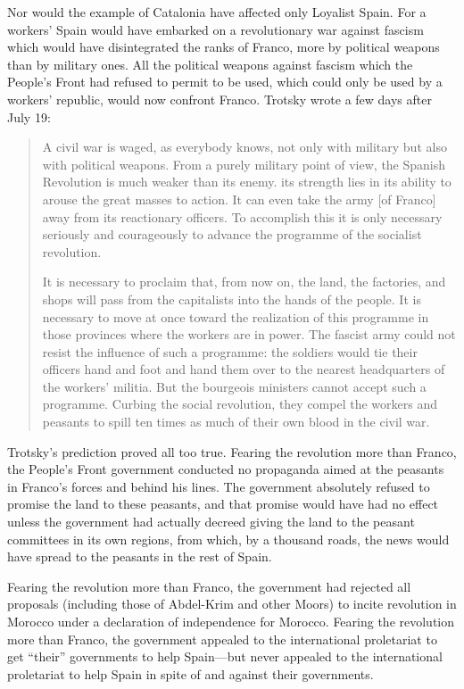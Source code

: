 Nor would the example of Catalonia have affected only Loyalist Spain. For a workers’ Spain would have embarked on a revolutionary war against fascism which would have disintegrated the ranks of Franco, more by political weapons than by military ones. All the political weapons against fascism which the People’s Front had refused to permit to be used, which could only be used by a workers’ republic, would now confront Franco. Trotsky wrote a few days after July 19:

\begin{quotation}
  A civil war is waged, as everybody knows, not only with military but also with political weapons. From a purely military point of view, the Spanish Revolution is much weaker than its enemy. its strength lies in its ability to arouse the great masses to action. It can even take the army [of Franco] away from its reactionary officers. To accomplish this it is only necessary seriously and courageously to advance the programme of the socialist revolution.

  It is necessary to proclaim that, from now on, the land, the factories, and shops will pass from the capitalists into the hands of the people. It is necessary to move at once toward the realization of this programme in those provinces where the workers are in power. The fascist army could not resist the influence of such a programme: the soldiers would tie their officers hand and foot and hand them over to the nearest headquarters of the workers’ militia. But the bourgeois ministers cannot accept such a programme. Curbing the social revolution, they compel the workers and peasants to spill ten times as much of their own blood in the civil war.
\end{quotation}

Trotsky’s prediction proved all too true. Fearing the revolution more than Franco, the People’s Front government conducted no propaganda aimed at the peasants in Franco’s forces and behind his lines. The government absolutely refused to promise the land to these peasants, and that promise would have had no effect unless the government had actually decreed giving the land to the peasant committees in its own regions, from which, by a thousand roads, the news would have spread to the peasants in the rest of Spain.
\noclub

Fearing the revolution more than Franco, the government had rejected all proposals (including those of Abdel-Krim and other Moors) to incite revolution in Morocco under a declaration of independence for Morocco. Fearing the revolution more than Franco, the government appealed to the international proletariat to get ``their'' governments to help Spain---but never appealed to the international proletariat to help Spain in spite of and against their governments.

